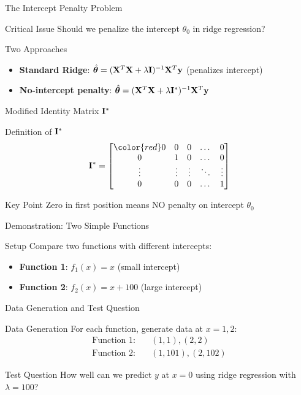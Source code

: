 \documentclass{beamer}
\begin{document}
\begin{frame}{The Intercept Penalty Problem}
\begin{alertbox}{Critical Issue}
Should we penalize the intercept $\theta_0$ in ridge regression?
\end{alertbox}

\begin{keypointsbox}{Two Approaches}
\begin{itemize}
\item \textbf{Standard Ridge}: $\hat{\boldsymbol{\theta}} = (\mathbf{X}^T\mathbf{X} + \lambda\mathbf{I})^{-1}\mathbf{X}^T\mathbf{y}$ (penalizes intercept)
\item \textbf{No-intercept penalty}: $\hat{\boldsymbol{\theta}} = (\mathbf{X}^T\mathbf{X} + \lambda\mathbf{I}^*)^{-1}\mathbf{X}^T\mathbf{y}$
\end{itemize}
\end{keypointsbox}
\end{frame}

\begin{frame}{Modified Identity Matrix $\mathbf{I}^*$}
\begin{codebox}{Definition of $\mathbf{I}^*$}
$$\mI^* = \begin{bmatrix}
    \color{red}0 & 0 & 0 & \dots  & 0 \\
    0 & 1& 0 & \dots  & 0\\
    \vdots & \vdots & \vdots & \ddots & \vdots \\
    0 & 0 & 0 & \dots  & 1
\end{bmatrix}$$
\end{codebox}

\begin{alertbox}{Key Point}
Zero in first position means NO penalty on intercept $\theta_0$
\end{alertbox}
\end{frame}

\begin{frame}{Demonstration: Two Simple Functions}
\begin{examplebox}{Setup}
Compare two functions with different intercepts:
\begin{itemize}
\item \textbf{Function 1}: $f_1(x) = x$ (small intercept)
\item \textbf{Function 2}: $f_2(x) = x + 100$ (large intercept)
\end{itemize}
\end{examplebox}
\end{frame}

\begin{frame}{Data Generation and Test Question}
\begin{codebox}{Data Generation}
For each function, generate data at $x = 1, 2$:
\begin{align}
\text{Function 1:} &\quad (1,1), (2,2) \\
\text{Function 2:} &\quad (1,101), (2,102)
\end{align}
\end{codebox}
\pause

\begin{alertbox}{Test Question}
How well can we predict $y$ at $x = 0$ using ridge regression with $\lambda = 100$?
\end{alertbox}
\end{frame}
\end{document}
